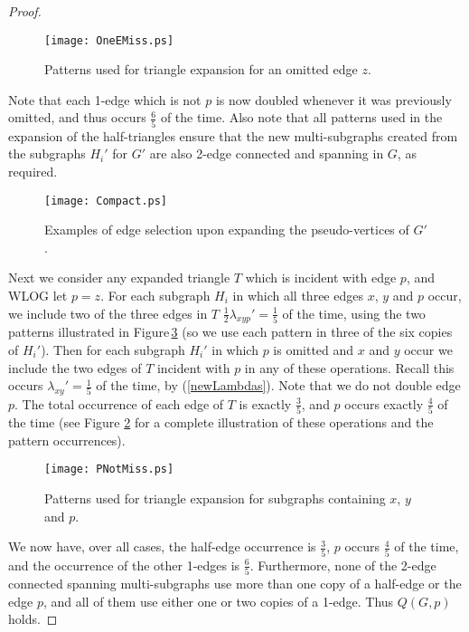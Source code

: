 \documentclass[oneeqnum,final]{siamltex1213}
\begin{document}
\begin{proof}
\begin{figure}
\begin{center}
\texttt{[image: OneEMiss.ps]}
\end{center}
\caption{Patterns used for triangle expansion for an omitted edge $z$.}
\label{ExpandingPseudoVerticesOneEdgeMissing}
\end{figure}

Note that each 1-edge which is not $p$ is now doubled whenever it was previously omitted, and thus occurs $\frac{6}{5}$ of the time. Also note that all patterns used in the expansion of the half-triangles ensure that the new multi-subgraphs created from the subgraphs $H_{i}'$ for $G'$ are also 2-edge connected and spanning in $G$, as required. 

\begin{figure}
\begin{center}
\texttt{[image: Compact.ps]}
\end{center}
\caption{Examples of edge selection upon expanding the pseudo-vertices of $G'$.}
\label{ExpandingPseudoVertices}
\end{figure}

Next we consider any expanded triangle $T$ which is incident with edge $p$, and WLOG let $p=z$. For each subgraph $H_{i}$ in which all three edges $x$, $y$ and $p$  occur, we include two of the three edges in $T$ $\frac{1}{2}\lambda_{xyp}'=\frac{1}{5}$ of the time, using the two patterns illustrated in Figure\,\ref{ExpandingPseudoVerticesPNotMissing} (so we use each pattern in three of the six copies of $H_{i}'$). Then for each subgraph $H_{i}'$ in which $p$ is omitted and $x$ and $y$ occur we include the two edges of $T$ incident with $p$ in any of these operations. Recall this occurs $\lambda_{xy}'=\frac{1}{5}$ of the time, by (\ref{newLambdas}). Note that we do not double edge $p$. The total occurrence of each edge of $T$ is exactly $\frac{3}{5}$, and $p$ occurs exactly $\frac{4}{5}$ of the time (see Figure \ref{ExpandingPseudoVertices} for a complete illustration of these operations and the pattern occurrences).

\begin{figure}
\begin{center}
\texttt{[image: PNotMiss.ps]}
\end{center}
\caption{Patterns used for triangle expansion for subgraphs containing $x$, $y$ and $p$.}
\label{ExpandingPseudoVerticesPNotMissing}
\end{figure}

We now have, over all cases, the half-edge occurrence is $\frac{3}{5}$, $p$ occurs $\frac{4}{5}$ of the time, and the occurrence of the other 1-edges is $\frac{6}{5}$. Furthermore, none of the 2-edge connected spanning multi-subgraphs use more than one copy of a half-edge or the edge $p$, and all of them use either one or two copies of a 1-edge. Thus $Q(G, p)$ holds.


\end{proof}
\end{document}

